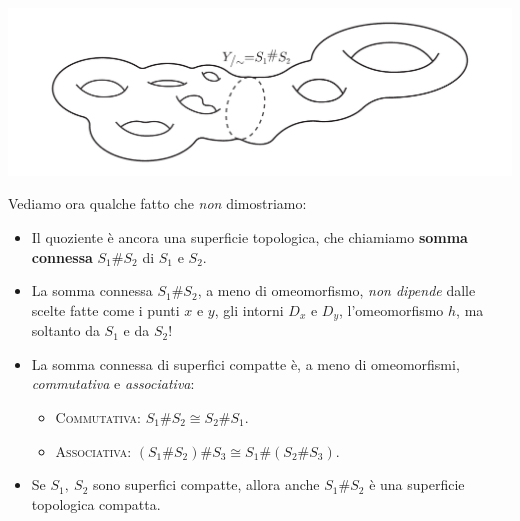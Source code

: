 \begin{center}
	\includegraphics[trim=0cm 0cm 0cm 0cm, clip, scale=0.4]{images/connectedsum3.pdf}
\end{center}
Vediamo ora qualche fatto che \textit{non} dimostriamo:
	\begin{itemize}
		\item Il quoziente è ancora una superficie topologica, che chiamiamo \textbf{somma connessa} $S_1\# S_2$  di $S_1$ e $S_2$. 
		\item La somma connessa $S_1\# S_2$, a meno di omeomorfismo, \textit{non dipende} dalle scelte fatte come i punti $x$ e $y$, gli intorni $D_x$ e $D_y$, l'omeomorfismo $h$, ma soltanto da $S_1$ e da $S_2$!
		\item La somma connessa di superfici compatte è, a meno di omeomorfismi, \textit{commutativa} e \textit{associativa}:
		\begin{itemize}
			\item \textsc{Commutativa}: $S_1\# S_2\cong S_2\# S_1$.
			\item \textsc{Associativa}: $\left(S_1\# S_2\right)\# S_3\cong S_1\#\left(S_2\# S_3\right)$.
		\end{itemize}
	\item Se $S_1,\ S_2$ sono superfici compatte, allora anche $S_1\# S_2$ è una superficie topologica compatta.
	\end{itemize}

